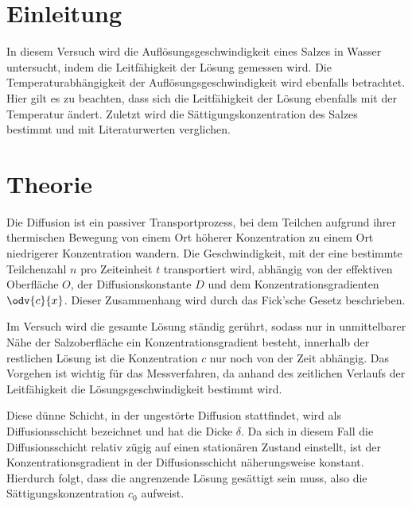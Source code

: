 \section{Einleitung}
In diesem Versuch wird die Auflösungsgeschwindigkeit eines Salzes in Wasser untersucht, indem die Leitfähigkeit der Lösung gemessen wird.
Die Temperaturabhängigkeit der Auflösungsgeschwindigkeit wird ebenfalls betrachtet.
Hier gilt es zu beachten, dass sich die Leitfähigkeit der Lösung ebenfalls mit der Temperatur ändert.
Zuletzt wird die Sättigungskonzentration des Salzes bestimmt und mit Literaturwerten verglichen.

\section{Theorie}
Die Diffusion ist ein passiver Transportprozess, bei dem Teilchen aufgrund ihrer thermischen Bewegung von einem Ort höherer Konzentration zu einem Ort niedrigerer Konzentration wandern.
Die Geschwindigkeit, mit der eine bestimmte Teilchenzahl $n$ pro Zeiteinheit $t$ transportiert wird, abhängig von der effektiven Oberfläche $O$, der Diffusionskonstante $D$ und dem Konzentrationsgradienten $\odv{c}{x}$.
Dieser Zusammenhang wird durch das Fick'sche Gesetz beschrieben.

Im Versuch wird die gesamte Lösung ständig gerührt, sodass nur in unmittelbarer Nähe der Salzoberfläche ein Konzentrationsgradient besteht, innerhalb der restlichen Lösung ist die Konzentration $c$ nur noch von der Zeit abhängig.
Das Vorgehen ist wichtig für das Messverfahren, da anhand des zeitlichen Verlaufs der Leitfähigkeit die Lösungsgeschwindigkeit bestimmt wird.

Diese dünne Schicht, in der ungestörte Diffusion stattfindet, wird als Diffusionsschicht bezeichnet und hat die Dicke $\delta$.
Da sich in diesem Fall die Diffusionsschicht relativ zügig auf einen stationären Zustand einstellt, ist der Konzentrationsgradient in der Diffusionsschicht näherungsweise konstant.
Hierdurch folgt, dass die angrenzende Lösung gesättigt sein muss, also die Sättigungskonzentration $c_0$ aufweist.

